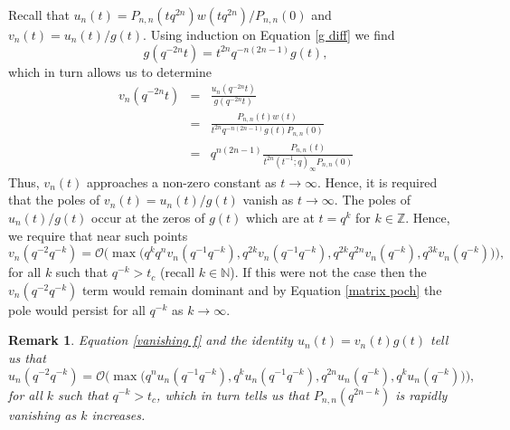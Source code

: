 \documentclass[a4paper,reqno]{amsart}
\numberwithin{equation}{section}
\newtheorem{remark}[theorem]{Remark}
\numberwithin{figure}{section}
\begin{document}
Recall that $u_n(t) = P_{n,n}(tq^{2n})w(tq^{2n})/P_{n,n}(0)$ and $v_n(t)=u_n(t)/g(t)$. Using induction on Equation \eqref{g diff} we find
\[ g(q^{-2n}t) = t^{2n}q^{-n(2n-1)}g(t) ,\]
which in turn allows us to determine 
\begin{eqnarray}
    v_n(q^{-2n}t) &=& \frac{u_n(q^{-2n}t)}{g(q^{-2n}t)}\nonumber \\
    &=& \frac{P_{n,n}(t)w(t)}{t^{2n}q^{-n(2n-1)}g(t)P_{n,n}(0)}\nonumber \\
    &=& q^{n(2n-1)}\frac{P_{n,n}(t)}{t^{2n}(t^{-1};q)_\infty P_{n,n}(0)}\label{eq vnqn}
\end{eqnarray}
Thus, $v_n(t)$ approaches a non-zero constant as $t\to\infty$. Hence, it is required that the poles of $v_n(t) = u_n(t)/g(t)$ vanish as $t\to\infty$. The poles of $u_n(t)/g(t)$ occur at the zeros of $g(t)$ which are at $t = q^{k}$ for $k\in\mathbb{Z}$. Hence, we require that near such points
\begin{equation}\label{vanishing f} v_n(q^{-2}q^{-k}) = \mathcal{O}\Big(\max\big(q^{k}q^{n}v_n(q^{-1}q^{-k}), q^{2k}v_n(q^{-1}q^{-k}), q^{2k}q^{2n}v_n(q^{-k}),q^{3k}v_n(q^{-k})\big)\Big) ,
\end{equation}
for all $k$ such that $q^{-k}>t_c$ (recall $k\in \mathbb{N}$). If this were not the case then the $v_n(q^{-2}q^{-k})$ term would remain dominant and by Equation \eqref{matrix poch} the pole would persist for all $q^{-k}$ as $k\to\infty$. 
\begin{remark}\label{un 0s}
Equation \eqref{vanishing f} and the identity $u_n(t) = v_n(t)g(t)$ tell us that
    \begin{equation}\nonumber u_n(q^{-2}q^{-k}) = \mathcal{O}\Big(\max\big(q^{n}u_n(q^{-1}q^{-k}), q^{k}u_n(q^{-1}q^{-k}), q^{2n}u_n(q^{-k}),q^{k}u_n(q^{-k})\big)\Big) ,
\end{equation}
for all $k$ such that $q^{-k}>t_c$, which in turn tells us that $P_{n,n}(q^{2n-k})$ is rapidly vanishing as $k$ increases.  
\end{remark}
\end{document}
